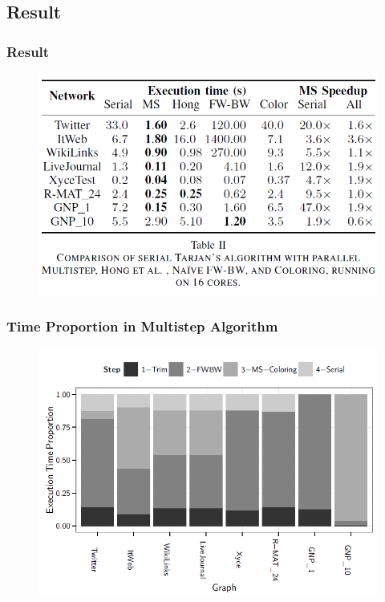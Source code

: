 \subsection{Result}
\begin{frame}
	\frametitle{Result}
	\begin{figure}
		\includegraphics[scale=0.35]{figure/fig-result.png}
	\end{figure}
\end{frame}

\begin{frame}
	\frametitle{Time Proportion in Multistep Algorithm}
	\begin{figure}
		\includegraphics[scale=0.40]{figure/fig-result-p1.png}
	\end{figure}
\end{frame}

